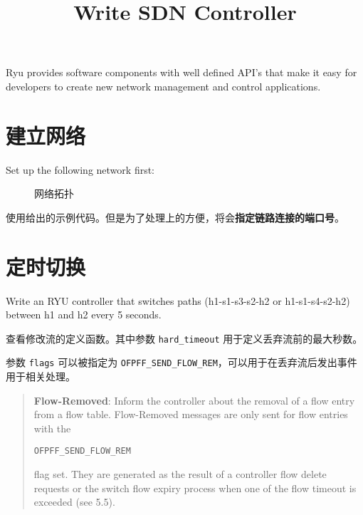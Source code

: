 \endofdump
{}

    \title{Write SDN Controller}
    \maketitle
    \tableofcontents
    \vfill
    Ryu provides software components with well defined API's that make it easy for developers to create new network management and control applications.
    \vfill
    \clearpage
    \section{建立网络}
    Set up the following network first:
    
    \hfill
    
    \begin{figure}[H]
        \centering
        
        \caption{网络拓扑}\label{fig:topo}
    \end{figure}

    使用给出的示例代码。但是为了处理上的方便，将会\textbf{指定链路连接的端口号}。

    \section{定时切换}
    Write an RYU controller that switches paths (h1-s1-s3-s2-h2 or h1-s1-s4-s2-h2) between h1 and h2 every 5 seconds. 

    查看修改流的定义函数。其中参数 \texttt{hard\_timeout} 用于定义丢弃流前的最大秒数。

    
    参数 \texttt{flags} 可以被指定为 \texttt{OFPFF\_SEND\_FLOW\_REM}，可以用于在丢弃流后发出事件用于相关处理。

    \begin{quotation}
    \textbf{Flow-Removed}: Inform the controller about the removal of a flow entry from a flow table. Flow-Removed messages are only sent for flow entries with the 
    \begin{center}
        \verb"OFPFF_SEND_FLOW_REM"
    \end{center} flag set. They are
generated as the result of a controller flow delete requests or the switch flow expiry process when one of the
flow timeout is exceeded (see 5.5).\cite{openflow13}
    \end{quotation}


